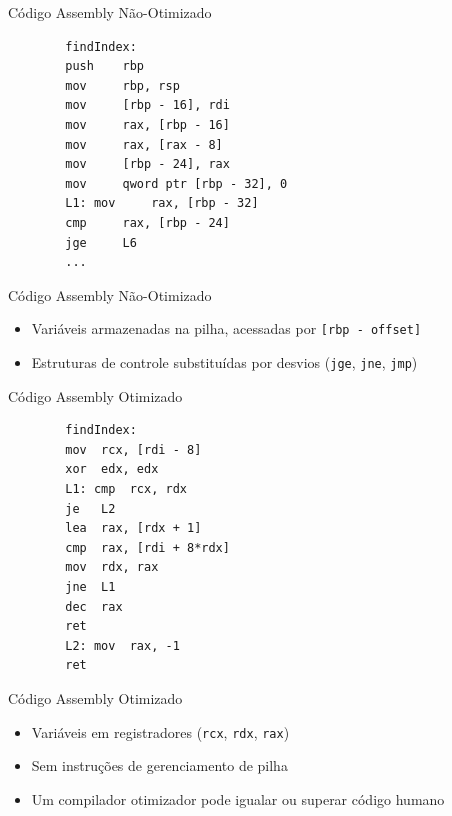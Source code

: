 \begin{frame}[fragile]{Código Assembly Não-Otimizado}

    \begin{lstlisting}
        findIndex:
        push    rbp
        mov     rbp, rsp
        mov     [rbp - 16], rdi
        mov     rax, [rbp - 16]
        mov     rax, [rax - 8]
        mov     [rbp - 24], rax
        mov     qword ptr [rbp - 32], 0
        L1: mov     rax, [rbp - 32]
        cmp     rax, [rbp - 24]
        jge     L6
        ...
    \end{lstlisting}
\end{frame}

\begin{frame}[fragile]{Código Assembly Não-Otimizado}

    \begin{itemize}

        \item
        Variáveis armazenadas na pilha, acessadas por
        \texttt{[rbp - offset]}
        \item
        Estruturas de controle substituídas por desvios
        (\texttt{jge}, \texttt{jne},
        \texttt{jmp})
    \end{itemize}
\end{frame}

\begin{frame}[fragile]{Código Assembly Otimizado}

    \begin{lstlisting}
        findIndex:
        mov  rcx, [rdi - 8]
        xor  edx, edx
        L1: cmp  rcx, rdx
        je   L2
        lea  rax, [rdx + 1]
        cmp  rax, [rdi + 8*rdx]
        mov  rdx, rax
        jne  L1
        dec  rax
        ret
        L2: mov  rax, -1
        ret
    \end{lstlisting}
\end{frame}

\begin{frame}[fragile]{Código Assembly Otimizado}

    \begin{itemize}

        \item
        Variáveis em registradores (\texttt{rcx},
        \texttt{rdx}, \texttt{rax})
        \item
        Sem instruções de gerenciamento de pilha
        \item
        Um compilador otimizador pode igualar ou superar código humano
    \end{itemize}
\end{frame}

